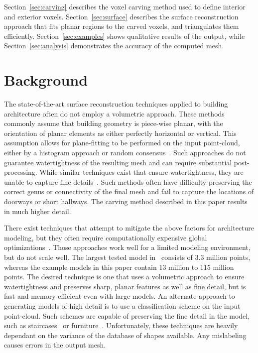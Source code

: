 \documentclass[10pt,twocolumn,letterpaper]{article}
\begin{document}

Section~\ref{sec:carving} describes the voxel carving method used to define interior and exterior voxels.  Section~\ref{sec:surface} describes the surface reconstruction approach that fits planar regions to the carved voxels, and triangulates them efficiently.  Section~\ref{sec:examples} shows qualitative results of the output, while Section~\ref{sec:analysis} demonstrates the accuracy of the computed mesh.

\section{Background}


The state-of-the-art surface reconstruction techniques applied to building architecture often do not employ a volumetric approach.  These methods commonly assume that building geometry is piece-wise planar, with the orientation of planar elements as either perfectly horizontal or vertical.  This assumption allows for plane-fitting to be performed on the input point-cloud, either by a histogram approach or random consensus~\cite{HistWallRecon,Victors,BasicPlaneFit}.  Such approaches do not guarantee watertightness of the resulting mesh and can require substantial post-processing.  While similar techniques exist that ensure watertightness, they are unable to capture fine details~\cite{Museums}.  Such methods often have difficulty preserving the correct genus or connectivity of the final mesh and fail to capture the locations of doorways or short hallways.  The carving method described in this paper results in much higher detail.

There exist techniques that attempt to mitigate the above factors for architecture modeling, but they often require computationally expensive global optimizations~\cite{Pons10}.  Those approaches work well for a limited modeling environment, but do not scale well.  The largest tested model in~\cite{Pons10} consists of 3.3 million points, whereas the example models in this paper contain 13 million to 115 million points.  The desired technique is one that uses a volumetric approach to ensure watertightness and preserves sharp, planar features as well as fine detail, but is fast and memory efficient even with large models.  An alternate approach to generating models of high detail is to use a classification scheme on the input point-cloud.  Such schemes are capable of preserving the fine detail in the model, such as staircases~\cite{Victors} or furniture~\cite{Kim12, SearchClassifyPointcloud, Shao12}.  Unfortunately, these techniques are heavily dependant on the variance of the database of shapes available.  Any mislabeling causes errors in the output mesh.
\end{document}
